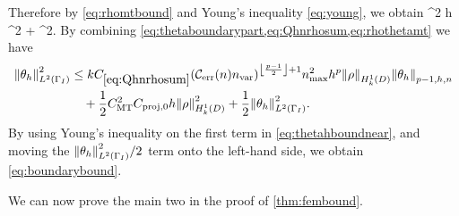 \eeq
Therefore by \cref{eq:rhomtbound} and Young's inequality \cref{eq:young}, we obtain
\beq\label{eq:rhothetamt}
\NLtGI{\rho}\NLtGI{\thetah} \leq \half \CMT^2  h \NHokD{\rho}^2 + \half \NLtGI{\thetah}^2.
\eeq
By combining \cref{eq:thetaboundarypart,eq:Qhnrhosum,eq:rhothetamt} we have
\begin{align}
\NLtGI{\thetah}^2 &\leq k \Cmess \mleft(\En\nvar\mright)^{\floor{\frac{p-1}2}+1}\nmax^2 h^p \NHokD{\rho}\Nfn{p-1,h,n}{\thetah}\nonumber\\
&\quad+ \half \CMT^2 \Cprojfn{0} h\NHokD{\rho}^2 + \half \NLtGI{\thetah}^2.\label{eq:thetahboundnear}
\end{align}
By using Young's inequality on the first term in \cref{eq:thetahboundnear}, and moving the $\NLtGI{\thetah}^2/2$ term onto the left-hand side, we obtain \cref{eq:boundarybound}.
\epf

We can now prove the main two  in the proof of \cref{thm:fembound}.

